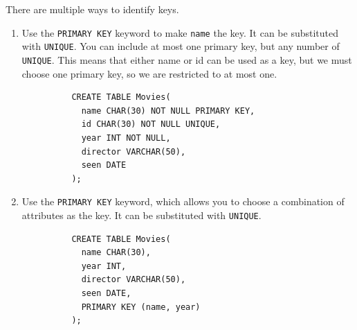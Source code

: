 \documentclass{article}
\begin{document}
    \begin{definition}
      There are multiple ways to identify keys. 
      \begin{enumerate}
        \item Use the \texttt{PRIMARY KEY} keyword to make \texttt{name} the key. It can be substituted with \texttt{UNIQUE}. You can include at most one primary key, but any number of \texttt{UNIQUE}. This means that either name or id can be used as a key, but we must choose one primary key, so we are restricted to at most one. 
        \begin{lstlisting}
          CREATE TABLE Movies(
            name CHAR(30) NOT NULL PRIMARY KEY,
            id CHAR(30) NOT NULL UNIQUE,
            year INT NOT NULL, 
            director VARCHAR(50), 
            seen DATE
          ); 
        \end{lstlisting}

        \item Use the \texttt{PRIMARY KEY} keyword, which allows you to choose a combination of attributes as the key. It can be substituted with \texttt{UNIQUE}. 
        \begin{lstlisting}
          CREATE TABLE Movies(
            name CHAR(30),
            year INT, 
            director VARCHAR(50), 
            seen DATE, 
            PRIMARY KEY (name, year)
          ); 
        \end{lstlisting}
      \end{enumerate}
    \end{definition}
\end{document}
